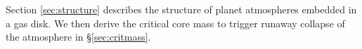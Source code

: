 \documentclass[12pt, preprint,numberedappendix]{emulateapj}
\begin{document}



Section \ref{sec:structure} describes the structure of planet atmospheres embedded in a gas disk.   We then derive the critical core mass to trigger runaway collapse of the atmosphere in \S\ref{sec:critmass}.
\end{document}
